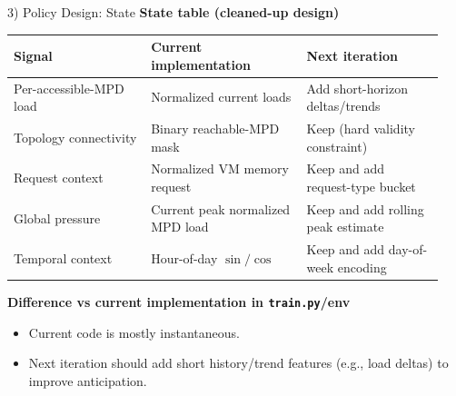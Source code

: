 \documentclass[10pt,aspectratio=169]{beamer}
\begin{document}
\begin{frame}{3) Policy Design: State}
  \textbf{State table (cleaned-up design)}
  \scriptsize
  \begin{tabular}{p{0.30\linewidth}p{0.34\linewidth}p{0.30\linewidth}}
    \toprule
    \textbf{Signal} & \textbf{Current implementation} & \textbf{Next iteration} \\
    \midrule
    Per-accessible-MPD load & Normalized current loads & Add short-horizon deltas/trends \\
    Topology connectivity & Binary reachable-MPD mask & Keep (hard validity constraint) \\
    Request context & Normalized VM memory request & Keep and add request-type bucket \\
    Global pressure & Current peak normalized MPD load & Keep and add rolling peak estimate \\
    Temporal context & Hour-of-day $\sin/\cos$ & Keep and add day-of-week encoding \\
    \bottomrule
  \end{tabular}
  \normalsize
  \vspace{0.3em}
  \textbf{Difference vs current implementation in \texttt{train.py}/env}
  \begin{itemize}
    \item Current code is mostly instantaneous.
    \item Next iteration should add short history/trend features (e.g., load deltas)
      to improve anticipation.
  \end{itemize}
\end{frame}
\end{document}
